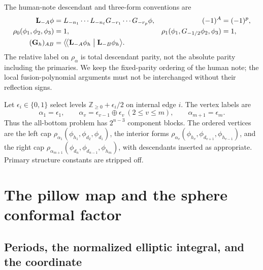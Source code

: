 \documentclass[11pt]{article}
\numberwithin{equation}{section}
\newcommand{\bpzbraket}[2]{\bigl\langle\!\bigl\langle #1\bigm|#2\bigr\rangle}
\begin{document}
The human-note descendant and three-form conventions are
\begin{align}
 \mathbf L_{-A}\phi
 &=L_{-n_1}\cdots L_{-n_\ell}G_{-r_1}\cdots G_{-r_p}\phi,
 &(-1)^A&=(-1)^p,\notag\\
 \rho_0(\phi_1,\phi_2,\phi_3)&=1,
 &\rho_1(\phi_1,G_{-1/2}\phi_2,\phi_3)&=1,
 \label{eq:three-form-convention}\\
 (\mathbf G_h)_{AB}
 &=\bpzbraket{\mathbf L_{-A}\phi_h}{\mathbf L_{-B}\phi_h}.
 \notag
\end{align}
The relative label on $\rho_\alpha$ is total descendant parity, not the
absolute parity including the primaries. We keep the fixed-parity
ordering of the human note; the local fusion-polynomial arguments must
not be interchanged without their reflection signs.

Let $\epsilon_i\in\{0,1\}$ select levels
$\mathbb Z_{\geq0}+\epsilon_i/2$ on internal edge $i$. The vertex labels are
\begin{equation}
 \alpha_1=\epsilon_1,\qquad
 \alpha_v=\epsilon_{v-1}\oplus\epsilon_v\ (2\leq v\leq m),\qquad
 \alpha_{m+1}=\epsilon_m.
 \label{eq:vertex-labels}
\end{equation}
Thus the all-bottom problem has $2^{n-3}$ component blocks. The ordered
vertices are the left cap $\rho_{\alpha_1}(\phi_{h_1},\phi_{d_2},\phi_{d_1})$,
the interior forms
$\rho_{\alpha_v}(\phi_{h_v},\phi_{d_{v+1}},\phi_{h_{v-1}})$,
and the right cap
$\rho_{\alpha_{m+1}}(\phi_{d_n},\phi_{d_{n-1}},\phi_{h_m})$,
with descendants inserted as appropriate. Primary structure constants
are stripped off.

\section{The pillow map and the sphere conformal factor}
\label{sec:geometry}

\subsection{Periods, the normalized elliptic integral, and the coordinate}
\end{document}
